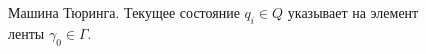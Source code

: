 \begin{figure}
\centering



\caption{Машина Тюринга. Текущее состояние $q_i \in Q$ указывает на
  элемент ленты $\gamma_0 \in \Gamma$.} 
\label{figAddAlgoTuring}
\end{figure}
